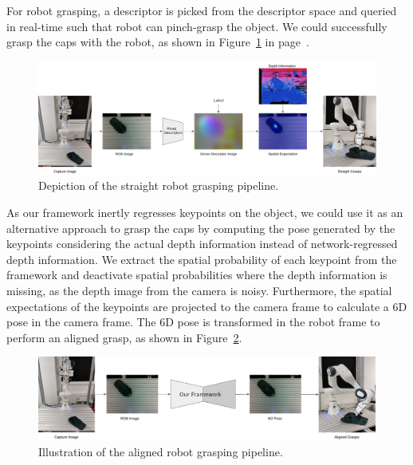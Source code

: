For robot grasping, a descriptor is picked from the descriptor space and queried in real-time such that robot can pinch-grasp the object.
We could successfully grasp the caps with the robot, as shown in Figure~\ref{fig:straight_grasp} in page~\pageref{fig:straight_grasp}.

\begin{figure}[htb]
    \centering
    \includegraphics[scale=0.15]{images/straight_grasps.png}
    \caption{Depiction of the straight robot grasping pipeline.}
    \label{fig:straight_grasp}
\end{figure}

As our framework inertly regresses keypoints on the object, we could use it as an alternative approach to grasp the caps by computing the pose
generated by the keypoints considering the actual depth information instead of network-regressed depth information.
We extract the spatial probability of each keypoint from the framework and deactivate spatial probabilities where the depth information is missing,
as the depth image from the camera is noisy. Furthermore, the spatial expectations of the keypoints are projected to the camera frame
to calculate a 6D pose in the camera frame. The 6D pose is transformed in the robot frame to perform an aligned grasp, as shown in Figure~\ref{fig:aligned_grasp}.

\begin{figure}[htb]
    \centering
    \includegraphics[scale=0.17]{images/aligned.png}
    \caption{Illustration of the aligned robot grasping pipeline.}
    \label{fig:aligned_grasp}
\end{figure}


